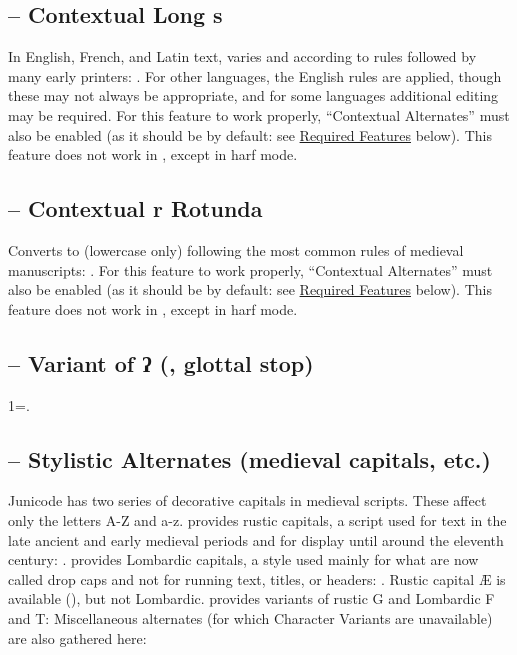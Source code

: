 \subsection{ – Contextual Long s}
In English, French, and Latin text, varies  and  according to rules
followed by many early printers: . For other languages, the English rules are applied, though these may not always be
appropriate, and for some languages additional editing may be required. For this
feature to work properly,  “Contextual Alternates” must also be enabled (as it should be by
default: see \hyperlink{req}{Required Features} below). This feature does not work in {\ltech}, except in harf mode.

\subsection{ –
Contextual r Rotunda}\hypertarget{ss16}{}
Converts  to  (lowercase only) following the
most common rules of medieval manuscripts:
.
For this feature to work properly,
 “Contextual Alternates” must also be enabled (as it should be by default: see
\hyperlink{req}{Required Features} below).  This feature does not work in {\ltech}, except in harf mode.

\subsection{ – Variant of ʔ (, glottal stop)}
1=.

\subsection{ –
Stylistic Alternates (medieval capitals, etc.)}\hypertarget{salt}{}
Junicode has two series of decorative capitals in medieval scripts. These affect only the letters
A-Z and a-z.  provides rustic capitals, a script used for text in the late
ancient and early medieval periods and for display until around the eleventh century:
. 
provides Lombardic capitals, a style used mainly for what are now called drop caps and not for
running text, titles, or headers:
.
Rustic capital Æ is available (), but not Lombardic.
 provides variants of rustic G and Lombardic F and T:
Miscellaneous alternates (for which Character Variants are
unavailable) are also gathered here:

